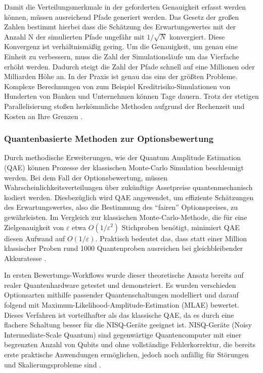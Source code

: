 Damit die Verteilungsmerkmale in der geforderten Genauigkeit erfasst werden können, müssen ausreichend Pfade generiert werden. Das Gesetz der großen Zahlen bestimmt hierbei dass die Schätzung des Erwartungswertes mit der Anzahl N der simulierten Pfade ungefähr mit $1/\sqrt{N}$ konvergiert. Diese Konvergenz ist verhältnismäßig gering. Um die Genauigkeit, um genau eine Einheit zu verbessern, muss die Zahl der Simulationsläufe um das Vierfache erhöht werden. Dadurch steigt die Zahl der Pfade schnell auf eine Millionen oder Milliarden Höhe an.
In der Praxis ist genau das eins der größten Probleme. Komplexe Berechnungen von zum Beispiel Kreditrisiko-Simulationen von Hunderten von Banken und Unternehmen können Tage dauern. Trotz der stetigen Parallelisierung stoßen herkömmliche Methoden aufgrund der Rechenzeit und Kosten an Ihre Grenzen \cite{orus_quantum_2019}.

\subsubsection*{Quantenbasierte Methoden zur Optionsbewertung}
Durch methodische Erweiterungen, wie der Quantum Amplitude Estimation (QAE) können Prozesse der klassischen Monte-Carlo Simulation beschleunigt werden. Bei dem Fall der Optionsbewertung, müssen Wahrscheinlichkeitsverteilungen über zukünftige Assetpreise quantenmechanisch kodiert werden. Diesbezüglich wird QAE angewendet, um effiziente Schätzungen des Erwartungswertes, also die Bestimmung des “fairen” Optionspreises, zu gewährleisten. Im Vergleich zur klassischen Monte-Carlo-Methode, die für eine Zielgenauigkeit von $\varepsilon$ etwa $O(1/\varepsilon^2)$ Stichproben benötigt, minimiert QAE diesen Aufwand auf $O(1/\varepsilon)$. Praktisch bedeutet das, dass statt einer Million klassischer Proben rund 1000 Quantenproben ausreichen bei gleichbleibender Akkuratesse \cite{Brassard/Lomonaco+Brandt; Montanaro, 2015}.

In ersten Bewertungs-Workflows wurde dieser theoretische Ansatz bereits auf realer Quantenhardware getestet und demonstriert. Es wurden verschieden Optionsarten mithilfe passender Quantenschaltungen modelliert und darauf folgend mit Maximum-Likelihood-Amplitude-Estimation (MLAE) bewertet. Dieses Verfahren ist vorteilhafter als das klassische QAE, da es durch eine flachere Schaltung besser für die NISQ-Geräte geeignet ist. NISQ-Geräte (Noisy Intermediate-Scale Quantum) sind gegenwärtige Quantencomputer mit einer begrenzten Anzahl von Qubits und ohne vollständige Fehlerkorrektur, die bereits erste praktische Anwendungen ermöglichen, jedoch noch anfällig für Störungen und Skalierungsprobleme sind \cite{stamatopoulos_option_2020}.

